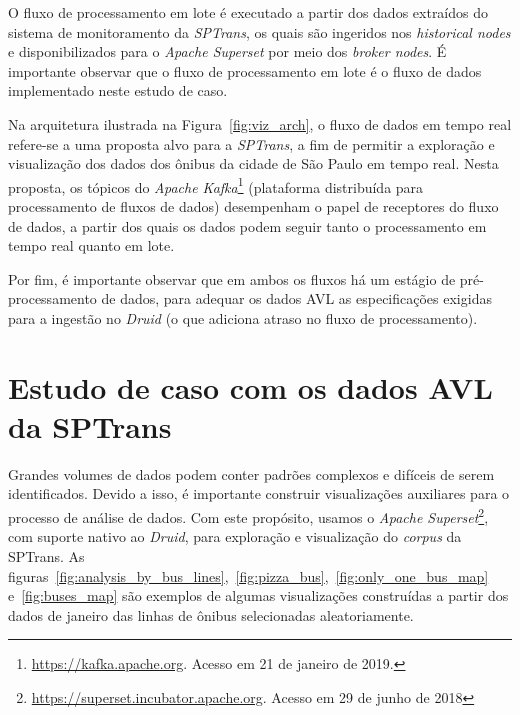 \documentclass[
	12pt,				%
	oneside,			%
	a4paper,			%
	english,			%
	brazil				%
	]{abntex2ppgsi}
\begin{document}
{{{O fluxo de processamento em lote é executado a partir dos dados extraídos do sistema de monitoramento da \textit{SPTrans}, os quais são ingeridos nos \textit{historical nodes} 
e disponibilizados para o \textit{Apache Superset} por meio dos \textit{broker nodes}. 
É importante observar que o fluxo de processamento em lote é o fluxo de dados implementado neste estudo de caso.

Na arquitetura ilustrada na Figura~\ref{fig:viz_arch}, o fluxo de dados em tempo real refere-se a uma proposta alvo para a \textit{SPTrans}, a fim de permitir a exploração e visualização dos dados dos ônibus da cidade de São Paulo em tempo real. Nesta proposta, os tópicos do \textit{Apache Kafka}\footnote{\url{https://kafka.apache.org}. Acesso em 21 de janeiro de 2019.} (plataforma distribuída para processamento de fluxos de dados) desempenham o papel de receptores do fluxo de dados, a partir dos quais os dados podem seguir tanto o processamento em tempo real quanto em lote.

Por fim, é importante observar que em ambos os fluxos há um estágio de pré-processamento de dados, para adequar os dados AVL as especificações exigidas para a ingestão no \textit{Druid} (o que adiciona atraso no fluxo de processamento).

\section{Estudo de caso com os dados AVL da SPTrans}
\label{viz_case}

Grandes volumes de dados podem conter padrões complexos e difíceis de serem identificados. Devido a isso, é importante construir visualizações auxiliares para o processo de análise de dados. Com este propósito, usamos o \textit{Apache Superset}\footnote{\url{https://superset.incubator.apache.org}. Acesso em 29 de junho de 2018}, com suporte nativo ao \textit{Druid}, para exploração e visualização do \textit{corpus} da SPTrans. As figuras~\ref{fig:analysis_by_bus_lines},~\ref{fig:pizza_bus},~\ref{fig:only_one_bus_map} e~\ref{fig:buses_map} são exemplos de algumas visualizações construídas a partir dos dados de janeiro das linhas de ônibus selecionadas aleatoriamente.

}}}
\end{document}
